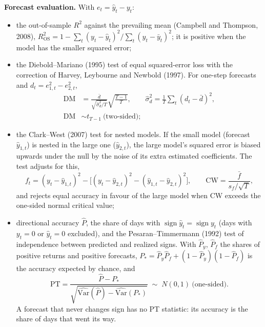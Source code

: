 \documentclass[11pt,a4paper]{article}
\begin{document}
\textbf{Forecast evaluation.} With $e_t = \hat y_t - y_t$:
\begin{itemize}
  \item the out-of-sample $R^2$ against the prevailing mean (Campbell and Thompson, 2008),
  $R^2_{\mathrm{OS}} = 1 - \sum_t (y_t - \hat y_t)^2 \big/ \sum_t (y_t - \bar y_t)^2$; it is positive when the model has the
  smaller squared error;
  \item the Diebold--Mariano (1995) test of equal squared-error loss with the correction of Harvey, Leybourne and Newbold (1997).
  For one-step forecasts and $d_t = e_{1,t}^2 - e_{2,t}^2$,
  \begin{equation}
    \begin{aligned}
    \mathrm{DM} &= \frac{\bar d}{\sqrt{\hat\sigma_d^2/T}}\sqrt{\frac{T-1}{T}}, \qquad
    \hat\sigma_d^2 = \frac1T\sum_t (d_t - \bar d)^2,\\
    \mathrm{DM} &\sim t_{T-1}\ \text{(two-sided)};
    \end{aligned}
  \end{equation}
  \item the Clark--West (2007) test for nested models. If the small model (forecast $\hat y_{1,t}$) is nested in the large one
  ($\hat y_{2,t}$), the large model's squared error is biased upwards under the null by the noise of its extra estimated
  coefficients. The test adjusts for this,
  \begin{equation}
    f_t = (y_t - \hat y_{1,t})^2 - \bigl[(y_t - \hat y_{2,t})^2 - (\hat y_{1,t} - \hat y_{2,t})^2\bigr], \qquad
    \mathrm{CW} = \frac{\bar f}{s_f/\sqrt T},
  \end{equation}
  and rejects equal accuracy in favour of the large model when CW exceeds the one-sided normal critical value;
  \item directional accuracy $\hat P$, the share of days with $\operatorname{sign}\hat y_t = \operatorname{sign} y_t$ (days with
  $y_t = 0$ or $\hat y_t = 0$ excluded), and the Pesaran--Timmermann (1992) test of independence between predicted and realized
  signs. With $\hat P_y$, $\hat P_f$ the shares of positive returns and positive forecasts,
  $P_* = \hat P_y \hat P_f + (1-\hat P_y)(1-\hat P_f)$ is the accuracy expected by chance, and
  \begin{equation}
    \mathrm{PT} = \frac{\hat P - P_*}{\sqrt{\widehat{\mathrm{Var}}(\hat P) - \widehat{\mathrm{Var}}(P_*)}}
    \;\sim\; N(0,1)\ \text{(one-sided)}.
  \end{equation}
  A forecast that never changes sign has no PT statistic: its accuracy is the share of days that went its way.
\end{itemize}
\end{document}
